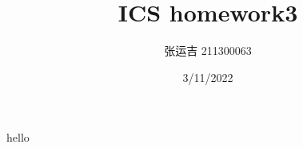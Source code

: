 \documentclass{article}
\title{ICS homework3}
\author{张运吉 211300063}
\date{3/11/2022}
\begin{document}
 
\maketitle %
hello
\end{document}
